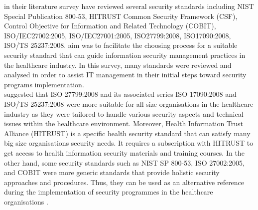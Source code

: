 \citet{Akowuah2013} in their literature survey have reviewed several security standards including NIST Special Publication 800-53, HITRUST Common Security Framework (CSF), Control Objective for Information and Related Technology (COBIT), ISO/IEC27002:2005, ISO/IEC27001:2005, ISO27799:2008, ISO17090:2008, ISO/TS 25237:2008. \cite{Akowuah2013} aim was to facilitate the choosing process for a suitable security standard that can guide information security management practices in the healthcare industry. In this survey, many standards were reviewed and analysed in order to assist IT management in their initial steps toward security programs implementation. \\
\citet{Akowuah2013} suggested that ISO 27799:2008 and its associated series ISO 17090:2008 and ISO/TS 25237:2008 were more suitable for all size organisations in the healthcare industry as they were tailored to handle various security aspects and technical issues within the healthcare environment. Moreover, Health Information Trust Alliance (HITRUST) is a specific health security standard that can satisfy many big size organisations security needs. It requires a subscription with HITRUST to get access to health information security materials and training courses. In the other hand, some security standards such as NIST SP 800-53, ISO 27002:2005, and COBIT were more generic standards that provide holistic security approaches and procedures. Thus, they can be used as an alternative reference during the implementation of security programmes in the healthcare organisations \cite{Akowuah2013}. 

